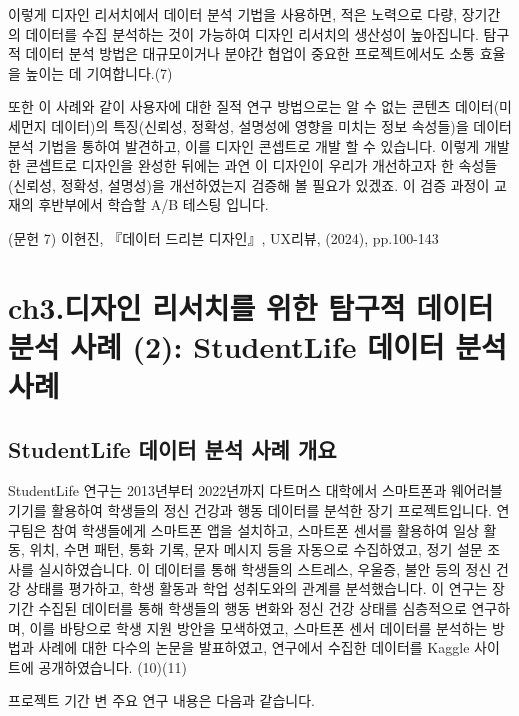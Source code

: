 \documentclass[
  letterpaper,
]{book}
\begin{document}
이렇게 디자인 리서치에서 데이터 분석 기법을 사용하면, 적은 노력으로
다량, 장기간의 데이터를 수집 분석하는 것이 가능하여 디자인 리서치의
생산성이 높아집니다. 탐구적 데이터 분석 방법은 대규모이거나 분야간
협업이 중요한 프로젝트에서도 소통 효율을 높이는 데 기여합니다.(7)

또한 이 사례와 같이 사용자에 대한 질적 연구 방법으로는 알 수 없는 콘텐츠
데이터(미세먼지 데이터)의 특징(신뢰성, 정확성, 설명성에 영향을 미치는
정보 속성들)을 데이터 분석 기법을 통하여 발견하고, 이를 디자인 콘셉트로
개발 할 수 있습니다. 이렇게 개발한 콘셉트로 디자인을 완성한 뒤에는 과연
이 디자인이 우리가 개선하고자 한 속성들(신뢰성, 정확성, 설명성)을
개선하였는지 검증해 볼 필요가 있겠죠. 이 검증 과정이 교재의 후반부에서
학습할 A/B 테스팅 입니다.

(문헌 7) 이현진, 『데이터 드리븐 디자인』, UX리뷰, (2024), pp.100-143

\chapter{ch3.디자인 리서치를 위한 탐구적 데이터 분석 사례 (2):
StudentLife 데이터 분석
사례}\label{ch3.uxb514uxc790uxc778-uxb9acuxc11cuxce58uxb97c-uxc704uxd55c-uxd0d0uxad6cuxc801-uxb370uxc774uxd130-uxbd84uxc11d-uxc0acuxb840-2-studentlife-uxb370uxc774uxd130-uxbd84uxc11d-uxc0acuxb840}

\section{StudentLife 데이터 분석 사례
개요}\label{studentlife-uxb370uxc774uxd130-uxbd84uxc11d-uxc0acuxb840-uxac1cuxc694}

StudentLife 연구는 2013년부터 2022년까지 다트머스 대학에서 스마트폰과
웨어러블 기기를 활용하여 학생들의 정신 건강과 행동 데이터를 분석한 장기
프로젝트입니다. 연구팀은 참여 학생들에게 스마트폰 앱을 설치하고,
스마트폰 센서를 활용하여 일상 활동, 위치, 수면 패턴, 통화 기록, 문자
메시지 등을 자동으로 수집하였고, 정기 설문 조사를 실시하였습니다. 이
데이터를 통해 학생들의 스트레스, 우울증, 불안 등의 정신 건강 상태를
평가하고, 학생 활동과 학업 성취도와의 관계를 분석했습니다. 이 연구는
장기간 수집된 데이터를 통해 학생들의 행동 변화와 정신 건강 상태를
심층적으로 연구하며, 이를 바탕으로 학생 지원 방안을 모색하였고, 스마트폰
센서 데이터를 분석하는 방법과 사례에 대한 다수의 논문을 발표하였고,
연구에서 수집한 데이터를 Kaggle 사이트에 공개하였습니다. (10)(11)

프로젝트 기간 변 주요 연구 내용은 다음과 같습니다.
\end{document}
